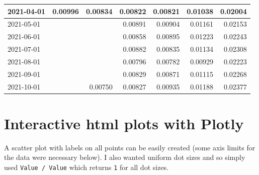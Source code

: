 \documentclass[
]{book}
\begin{document}
\begin{table}
\begin{tabular}[t]{l|r|r|r|r|r|r}
\hline
2021-04-01 & 0.00996 & 0.00834 & 0.00822 & 0.00821 & 0.01038 & 0.02004\\
\hline
2021-05-01 &  &  & 0.00891 & 0.00904 & 0.01161 & 0.02153\\
\hline
2021-06-01 &  &  & 0.00858 & 0.00895 & 0.01223 & 0.02243\\
\hline
2021-07-01 &  &  & 0.00882 & 0.00835 & 0.01134 & 0.02308\\
\hline
2021-08-01 &  &  & 0.00796 & 0.00782 & 0.00929 & 0.02223\\
\hline
2021-09-01 &  &  & 0.00829 & 0.00871 & 0.01115 & 0.02268\\
\hline
2021-10-01 &  & 0.00750 & 0.00827 & 0.00935 & 0.01188 & 0.02377\\
\hline
\end{tabular}
\end{table}

\hypertarget{interactive-html-plots-with-plotly}{%
\section{Interactive html plots with Plotly}\label{interactive-html-plots-with-plotly}}

A scatter plot with labels on all points can be easily created (some axis limits for the data were necessary below). I also wanted uniform dot sizes and so simply used \texttt{Value\ /\ Value} which returns \texttt{1} for all dot sizes.
\end{document}
